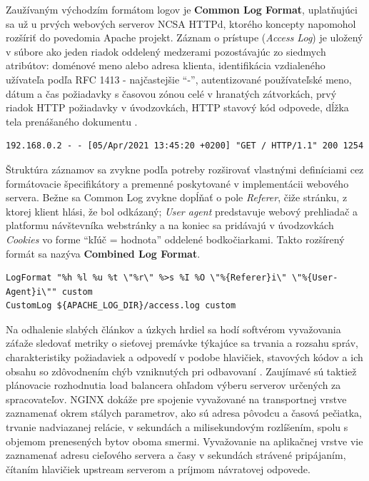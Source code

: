 \documentclass[12pt, a4paper]{article}
\begin{document}
Zaužívaným východzím formátom logov je \textbf{Common Log Format}, uplatňujúci sa už u prvých webových 
serverov NCSA HTTPd, ktorého koncepty napomohol rozšíriť do povedomia Apache projekt. Záznam o prístupe
(\emph{Access Log}) je uložený v súbore ako jeden riadok oddelený medzerami pozostávajúc zo siedmych
atribútov: doménové meno alebo adresa klienta, identifikácia vzdialeného užívateľa podľa
RFC 1413 - najčastejšie \enquote{-}, autentizované používateľské meno, dátum a čas požiadavky s časovou zónou 
celé v hranatých zátvorkách, prvý riadok HTTP požiadavky v úvodzovkách, HTTP stavový kód odpovede, dĺžka tela 
prenášaného dokumentu \cite{common-log}.
\begin{lstlisting}[caption=Ukážka záznamu v Common Log Format]
192.168.0.2 - - [05/Apr/2021 13:45:20 +0200] "GET / HTTP/1.1" 200 1254
\end{lstlisting}

Štruktúra záznamov sa zvykne podľa potreby rozširovať vlastnými definíciami cez formátovacie špecifikátory
a premenné poskytované v implementácii webového servera. Bežne sa Common Log zvykne dopĺňať o pole 
\emph{Referer}, čiže stránku, z ktorej klient hlási, že bol odkázaný; \emph{User agent} predstavuje webový 
prehliadač a platformu návštevníka webstránky a na koniec sa pridávajú v úvodzovkách \emph{Cookies} vo forme 
\enquote{kľúč = hodnota} oddelené bodkočiarkami. Takto rozšírený formát sa nazýva 
\textbf{Combined Log Format}.

\begin{lstlisting}[caption=Vlastný formát pre access log na webovom serveri Apache, 
basicstyle=\ttfamily\scriptsize]
LogFormat "%h %l %u %t \"%r\" %>s %I %O \"%{Referer}i\" \"%{User-Agent}i\"" custom
CustomLog ${APACHE_LOG_DIR}/access.log custom
\end{lstlisting}

Na odhalenie slabých článkov a úzkych hrdiel sa hodí softvérom vyvažovania záťaže sledovať
metriky o sieťovej premávke týkajúce sa trvania a rozsahu správ, charakteristiky požiadaviek
a odpovedí v podobe hlavičiek, stavových kódov a ich obsahu so zdôvodnením chýb vzniknutých pri
odbavovaní \cite{haproxy-logging}. Zaujímavé sú taktiež plánovacie rozhodnutia load balancera ohľadom
výberu serverov určených za spracovateľov. NGINX dokáže pre spojenie vyvažované na transportnej
vrstve zaznamenať okrem stálych parametrov, ako sú adresa pôvodcu a časová pečiatka, trvanie
nadviazanej relácie, v sekundách a milisekundovým rozlíšením, spolu s objemom prenesených bytov 
oboma smermi. Vyvažovanie na aplikačnej vrstve vie zaznamenať adresu cieľového servera a časy
v sekundách strávené pripájaním, čítaním hlavičiek upstream serverom a príjmom návratovej odpovede.
\end{document}
